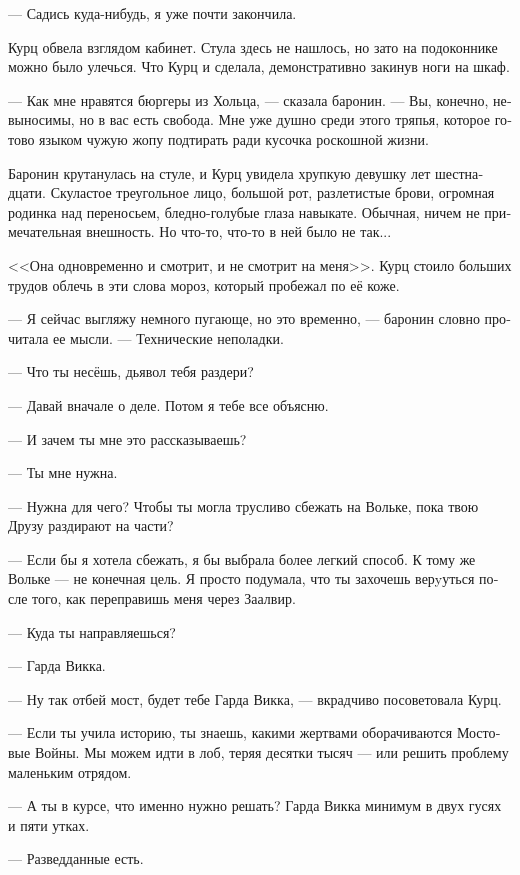 \documentclass[a4paper,12pt,fleqn]{book}\usepackage{polyglossia}\setdefaultlanguage[babelshorthands=true]{russian}\setotherlanguage{english}\defaultfontfeatures{Ligatures=TeX,Mapping=tex-text}\usepackage{xcolor}\newcommand{\ml}[3]{#2}
\newcommand{\asterism}{\vspace{1em}{\centering\Large\bfseries$\ast~\ast~\ast$\par}\vspace{1em}}
\begin{document}
--- Садись куда-нибудь, я уже почти закончила.

Курц обвела взглядом кабинет.
Стула здесь не нашлось, но зато на подоконнике можно было улечься.
Что Курц и сделала, демонстративно закинув ноги на шкаф.

--- Как мне нравятся бюргеры из Хольца, --- сказала баронин.
--- Вы, конечно, невыносимы, но в вас есть свобода.
Мне уже душно среди этого тряпья, которое готово языком чужую жопу подтирать ради кусочка роскошной жизни.

Баронин крутанулась на стуле, и Курц увидела хрупкую девушку лет шестнадцати.
Скуластое треугольное лицо, большой рот, разлетистые брови, огромная родинка над переносьем, бледно-голубые глаза навыкате.
Обычная, ничем не примечательная внешность.
Но что-то, что-то в ней было не так...

<<Она одновременно и смотрит, и не смотрит на меня>>.
Курц стоило больших трудов облечь в эти слова мороз, который пробежал по её коже.

--- Я сейчас выгляжу немного пугающе, но это временно, --- баронин словно прочитала ее мысли.
--- Технические неполадки.

--- Что ты несёшь, дьявол тебя раздери?

--- Давай вначале о деле.
Потом я тебе все объясню.

\asterism

--- И зачем ты мне это рассказываешь?

--- Ты мне нужна.

--- Нужна для чего?
Чтобы ты могла трусливо сбежать на Вольке, пока твою Друзу раздирают на части?

--- Если бы я хотела сбежать, я бы выбрала более легкий способ.
К тому же Вольке --- не конечная цель.
Я просто подумала, что ты захочешь верyуться после того, как переправишь меня через Заалвир.

--- Куда ты направляешься?

--- Гарда Викка.

--- Ну так отбей мост, будет тебе Гарда Викка, --- вкрадчиво посоветовала Курц.

--- Если ты учила историю, ты знаешь, какими жертвами оборачиваются Мостовые Войны.
Мы можем идти в лоб, теряя десятки тысяч --- или решить проблему маленьким отрядом.

--- А ты в курсе, что именно нужно решать?
Гарда Викка минимум в двух гусях и пяти утках.

--- Разведданные есть.
\end{document}
